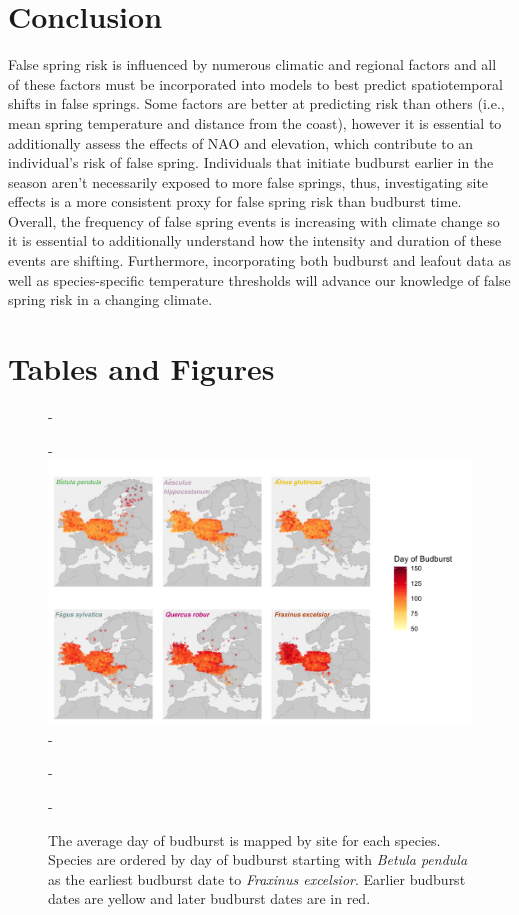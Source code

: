 \documentclass{article}\usepackage[]{graphicx}\usepackage[]{color}
\begin{document}
\section*{Conclusion}
False spring risk is influenced by numerous climatic and regional factors and all of these factors must be incorporated into models to best predict spatiotemporal shifts in false springs. Some factors are better at predicting risk than others (i.e., mean spring temperature and distance from the coast), however it is essential to additionally assess the effects of NAO and elevation, which contribute to an individual's risk of false spring. Individuals that initiate budburst earlier in the season aren't necessarily exposed to more false springs, thus, investigating site effects is a more consistent proxy for false spring risk than budburst time. Overall, the frequency of false spring events is increasing with climate change so it is essential to additionally understand how the intensity and duration of these events are shifting. Furthermore, incorporating both budburst and leafout data as well as species-specific temperature thresholds will advance our knowledge of false spring risk in a changing climate. %




\section*{Tables and Figures} 

{\begin{figure} [H]
  -\begin{center}
  -\includegraphics[width=14cm]{..//figures/BB_base.png}
  -\caption{The average day of budburst is mapped by site for each species. Species are ordered by day of budburst starting with \textit{Betula pendula} as the earliest budburst date to \textit{Fraxinus excelsior}. Earlier budburst dates are yellow and later budburst dates are in red. }\label{fig:bbmap}
  -\end{center}
  -\end{figure}}
  
\end{document}
